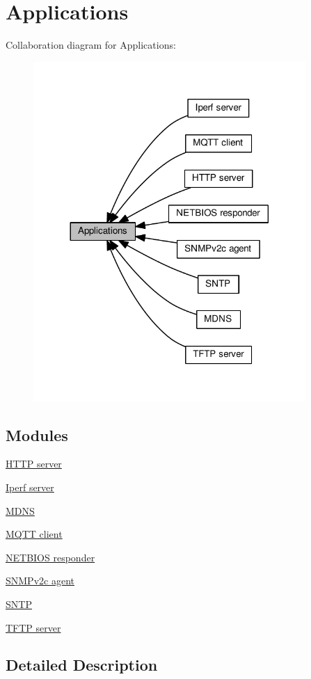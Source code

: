 \hypertarget{group__apps}{}\section{Applications}
\label{group__apps}
Collaboration diagram for Applications\+:
\nopagebreak
\begin{figure}[H]
\begin{center}
\leavevmode
\includegraphics[width=293pt]{group__apps}
\end{center}
\end{figure}
\subsection*{Modules}
\begin{DoxyCompactItemize}
\item 
\hyperlink{group__httpd}{H\+T\+T\+P server}
\item 
\hyperlink{group__iperf}{Iperf server}
\item 
\hyperlink{group__mdns}{M\+D\+NS}
\item 
\hyperlink{group__mqtt}{M\+Q\+T\+T client}
\item 
\hyperlink{group__netbiosns}{N\+E\+T\+B\+I\+O\+S responder}
\item 
\hyperlink{group__snmp}{S\+N\+M\+Pv2c agent}
\item 
\hyperlink{group__sntp}{S\+N\+TP}
\item 
\hyperlink{group__tftp}{T\+F\+T\+P server}
\end{DoxyCompactItemize}


\subsection{Detailed Description}
